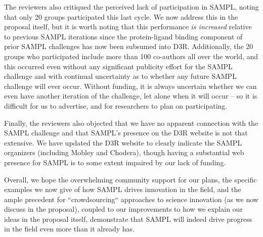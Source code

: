 \documentclass[11pt]{article}
\begin{document}
The reviewers also critiqued the perceived lack of participation in SAMPL, noting that only 20 groups participated this last cycle. 
We now address this in the proposal itself, but it is worth noting that this performance \emph{is increased} relative to previous SAMPL iterations since the protein-ligand binding component of prior SAMPL challenges has now been subsumed into D3R. 
Additionally, the 20 groups who participated include more than 100 co-authors all over the world, and this occurred even without any significant publicity effort for the SAMPL challenge and with continual uncertainty as to whether any future SAMPL challenge will ever occur. 
Without funding, it is always uncertain whether we can even have another iteration of the challenge, let alone when it will occur -- so it is difficult for us to advertise, and for researchers to plan on participating. 

Finally, the reviewers also objected that we have no apparent connection with the SAMPL challenge and that SAMPL's presence on the D3R website is not that extensive. 
We have updated the D3R website to clearly indicate the SAMPL organizers (including Mobley and Chodera), though having a substantial web presence for SAMPL is to some extent impaired by our lack of funding. 

Overall, we hope the overwhelming community support for our plans, the specific examples we now give of how SAMPL drives innovation in the field, and the ample precedent for ``crowdsourcing`` approaches to science innovation (as we now discuss in the proposal), coupled to our improvements to how we explain our ideas in the proposal itself, demonstrate that SAMPL will indeed drive progress in the field even more than it already has. 

\end{document}
